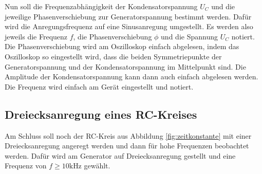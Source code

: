 Nun soll die Frequenzabhängigkeit der Kondensatorspannung $U_C$ und die jeweilige
Phasenverschiebung zur Generatorspannung bestimmt werden.
Dafür wird die Anregungsfrequenz auf eine Sinusanregung umgestellt.
Es werden also jeweils die Frequenz $f$, die Phasenverschiebung $\phi$ und die Spannung $U_C$ notiert.
Die Phasenverschiebung wird am Oszilloskop einfach abgelesen, indem das Oszilloskop so eingestellt wird,
dass die beiden Symmetriepunkte der Generatorspannung und der Kondensatorspannung im Mittelpunkt sind.
Die Amplitude der Kondensatorspannung kann dann auch einfach abgelesen werden.
Die Frequenz wird einfach am Gerät eingestellt und notiert.

\subsection{Dreiecksanregung eines RC-Kreises}

Am Schluss soll noch der RC-Kreis aus Abbildung \ref{fig:zeitkonstante} mit einer Dreiecksanregung angeregt werden
und dann für hohe Frequenzen beobachtet werden.
Dafür wird am Generator auf Dreiecksanregung gestellt und eine Frequenz von $f \geq 10 \si{\kilo\hertz}$ gewählt.